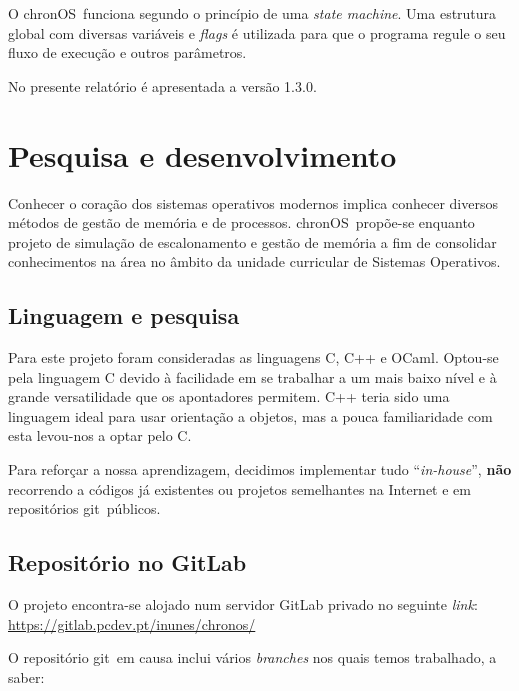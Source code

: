 \documentclass[10pt,oneside]{estiloUBI}
\newcommand{\chronOS}{\textsf{chronOS}}
\newcommand{\version}{1.3.0}
\newcommand{\git}{\textsf{git}}
\begin{document}
	O \chronOS~funciona segundo o princípio de uma \textit{state machine}. Uma estrutura global com diversas variáveis e \textit{flags} é utilizada para que o programa regule o seu fluxo de execução e outros parâmetros.
	
	No presente relatório é apresentada a versão \version.

	
	\tableofcontents
	\listoffigures
	\mainmatter


	
	\chapter{Pesquisa e desenvolvimento}
	\label{sec:dev}
	
	Conhecer o coração dos sistemas operativos modernos implica conhecer diversos métodos de gestão de memória e de processos. \chronOS~propõe-se enquanto projeto de simulação de escalonamento e gestão de memória a fim de consolidar conhecimentos na área no âmbito da unidade curricular de Sistemas Operativos.
	
	\section{Linguagem e pesquisa}
	\label{ssec:dev:sota}
	
	Para este projeto foram consideradas as linguagens C, C++ e OCaml. Optou-se pela linguagem C devido à facilidade em se trabalhar a um mais baixo nível e à grande versatilidade que os apontadores permitem. C++ teria sido uma linguagem ideal para usar orientação a objetos, mas a pouca familiaridade com esta levou-nos a optar pelo C.
	
	Para reforçar a nossa aprendizagem, decidimos implementar tudo ``\textit{in-house}'', \textbf{não} recorrendo a códigos já existentes ou projetos semelhantes na Internet e em repositórios \git~públicos.
	
	
	\section{Repositório no GitLab}
	\label{ssec:dev:gitlab}
	
	O projeto encontra-se alojado num servidor GitLab privado no seguinte \textit{link}: \url{https://gitlab.pcdev.pt/inunes/chronos/}
	
	O repositório \git~em causa inclui vários \textit{branches} nos quais temos trabalhado, a saber:
	
\end{document}

